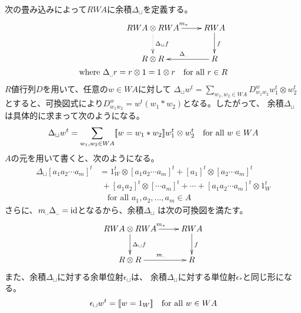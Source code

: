 	次の畳み込みによって$RWA$に余積$\Delta_\sqcup$を定義する。
	\begin{equation*}\begin{split} %
		\xymatrix{
			RWA\otimes RWA \ar[r]^{m_*} \ar@{.>}[d]^{\Delta_\sqcup f} 
			& RWA \ar[d]^{f} \\
			R\otimes R & R \ar[l]_{\Delta_\myspace} \\
		} \\
		\text{where } \Delta_\myspace r = r\otimes 1 = 1\otimes r
		\quad\text{for all }r\in R
	\end{split}\end{equation*} %
	$R$値行列$D$を用いて、任意の$w\in WA$に対して
	$\Delta_\sqcup w^t=\sum_{w_1,w_2\in WA}D_{w_1w_2}^ww_1^t\otimes w_2^t$
	とすると、可換図式により$D_{w_1w_2}^w=w^t(w_1*w_2)$となる。したがって、
	余積$\Delta_\sqcup$は具体的に求まって次のようになる。
	\begin{equation*}\begin{split} %
		\Delta_\sqcup w^t 
		= \sum_{w_1,w_2\in WA}\jump{w=w_1*w_2}w_1^t\otimes w_2^t
		\quad\text{for all }w\in WA
	\end{split}\end{equation*} %
	$A$の元を用いて書くと、次のようになる。
	\begin{equation*}\begin{split} %
		\Delta_\sqcup [a_1a_2\cdots a_m]^t
		&= 1_W^t\otimes [a_1a_2\cdots a_m]^t + [a_1]^t\otimes [a_2\cdots a_m]^t  \\
		&\;+ [a_1a_2]^t\otimes [\cdots a_m]^t + \cdots + [a_1a_2\cdots a_m]^t\otimes 1_W^t \\
		&\quad\text{for all }a_1,a_2,\dots,a_m\in A
	\end{split}\end{equation*} %
	さらに、$m_\myspace\Delta_\myspace=\myid$となるから、余積$\Delta_\sqcup$
	は次の可換図を満たす。
	\begin{equation*}\xymatrix{
		RWA\otimes RWA \ar[r]^{m_*} \ar[d]^{\Delta_\sqcup f} 
		& RWA \ar[d]^{f} \\
		R\otimes R \ar[r]^{m_\myspace} & R \\
	}\end{equation*}
	また、余積$\Delta_\sqcup$に対する余単位射$\epsilon_\sqcup$は、
	余積$\Delta_\sqcup$に対する単位射$\epsilon_*$と同じ形になる。
	\begin{equation*}\begin{split} %
		\epsilon_\sqcup w^t = \jump{w=1_W} \quad\text{for all }w\in WA
	\end{split}\end{equation*} %

